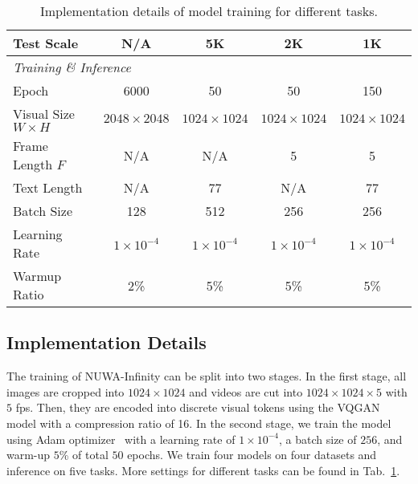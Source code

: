 \documentclass{article}
\begin{document}
\begin{table}[t]
\begin{tabular}{lcccc}
Test Scale                  & N/A                  & 5K                    & 2K                  & 1K                   \\
\midrule
\multicolumn{5}{l}{\textit{Training \& Inference}}\\
Epoch               & 6000                  & 50                   & 50                  & 150                   \\
Visual Size $W \times H$            & $2048\times 2048$         & $1024\times 1024$          & $1024\times 1024$         & $1024\times 1024$          \\
Frame Length $F$ & N/A & N/A & 5 & 5 \\
Text Length              & N/A              & 77                 & N/A               & 77                 \\
Batch Size                   & 128                 & 512                  & 256                 & 256                 \\
Learning Rate                &$1\times 10^{-4}$                & $1\times 10^{-4}$                 &$1\times 10^{-4}$                & $1\times 10^{-4}$                 \\
Warmup Ratio                 & 2\%                 & 5\%                 & 5\%                 & 5\%                 \\
\bottomrule
\end{tabular}
\caption{Implementation details of model training for different tasks. }
\label{tab:implementation_details}
\end{table}




\subsection{Implementation Details}\label{sub:imp}


The training of NUWA-Infinity can be split into two stages. In the first stage, all images are cropped into $1024 \times 1024$ and videos are cut into $1024 \times 1024 \times 5$ with $5$ fps. Then, they are encoded into discrete visual tokens using the VQGAN model
with a compression ratio of 16. 
In the second stage, we train the model using Adam optimizer~\cite{kingmaAdamMethodStochastic2014} with a learning rate of $1 \times 10^{-4}$, a batch size of $256$, and warm-up $5$\% of total $50$ epochs. We train four models on four datasets and inference on five tasks. More settings for different tasks can be found in Tab.~\ref{tab:implementation_details}. 
\end{document}
